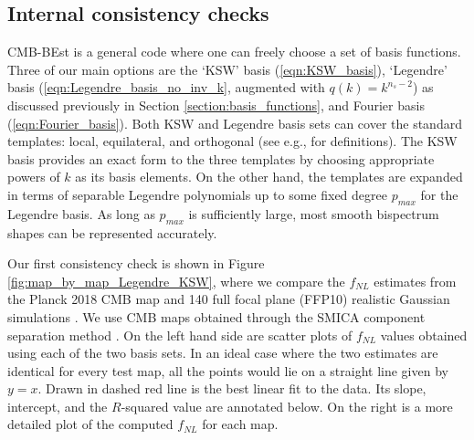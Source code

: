 \subsection{Internal consistency checks} \label{section:internal_consistency}

CMB-BEst is a general code where one can freely choose a set of basis functions. Three of our main options are the `KSW' basis (\ref{eqn:KSW_basis}), `Legendre' basis (\ref{eqn:Legendre_basis_no_inv_k}, augmented with $q(k)=k^{n_s-2}$) as discussed previously in Section \ref{section:basis_functions}, and Fourier basis (\ref{eqn:Fourier_basis}). Both KSW and Legendre basis sets can cover the standard templates: local, equilateral, and orthogonal (see e.g., \cite{PlanckCollaboration2013} for definitions). The KSW basis provides an exact form to the three templates by choosing appropriate powers of $k$ as its basis elements. On the other hand, the templates are expanded in terms of separable Legendre polynomials up to some fixed degree $p_{max}$ for the Legendre basis. As long as $p_{max}$ is sufficiently large, most smooth bispectrum shapes can be represented accurately. 

Our first consistency check is shown in Figure \ref{fig:map_by_map_Legendre_KSW}, where we compare the $f_{NL}$ estimates from the Planck 2018 CMB map and 140 full focal plane (FFP10) realistic Gaussian simulations \cite{PlanckCollaboration2015simulations}. We use CMB maps obtained through the SMICA component separation method \cite{Cardoso2008component, PlanckCollaboration2013ComponentSeparation}. On the left hand side are scatter plots of $f_{NL}$ values obtained using each of the two basis sets. In an ideal case where the two estimates are identical for every test map, all the points would lie on a straight line given by $y=x$. Drawn in dashed red line is the best linear fit to the data. Its slope, intercept, and the $R$-squared value are annotated below. On the right is a more detailed plot of the computed $f_{NL}$ for each map.

